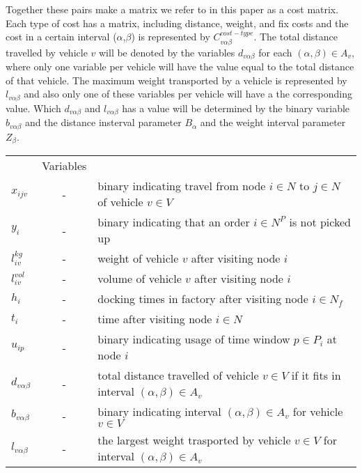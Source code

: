 \documentclass[a4paper,10pt]{article}
\begin{document}
Together these pairs make a matrix we refer to in this paper as a cost matrix. 
Each type of cost has a matrix, including distance, weight, and fix costs and the cost in a certain interval ($\alpha$,$\beta$) is represented by $C_{v\alpha\beta}^{cost-type}$. 
The total distance travelled by vehicle $v$ will be denoted by the variables $d_{v\alpha\beta}$ for each $(\alpha,\beta)\in A_v$, where only one variable per vehicle will have the value equal to the total distance of that vehicle. 
The maximum weight transported by a vehicle is represented by $l_{v\alpha\beta}$ and also only one of these variables per vehicle will have a the corresponding value.
Which $d_{v\alpha\beta}$ and $l_{v\alpha\beta}$ has a value will be determined by the binary variable $b_{v\alpha\beta}$ and the distance insterval parameter $B_\alpha$ and the weight interval parameter $Z_\beta$.  
\linebreak

\begin{tabular} {l c l}
    			&Variables										\\
	$x_{ijv}$	&-& 	binary indicating travel from node $i\in N$ to $j\in N$ of vehicle $v\in V$	\\
	$y_i$	        &-& 	binary indicating that an order $i\in N^P$ is not picked up             	\\
        $l_{iv}^{kg} $ 	&-& 	weight of vehicle $v$ after visiting node $i$        				\\
        $l_{iv}^{vol}$	&-&	volume of vehicle $v$ after visiting node $i$  					\\ 
	$h_i	$	&-&	docking times in factory after visiting node $i\in N_f$				\\
	$t_i 	$	&-&	time after visiting node $i\in N$						\\
	$u_{ip}	$	&-&	binary indicating usage of time window $p\in P_i$ at node $i$			\\
        $d_{v\alpha\beta} $	&-& 	total distance travelled of vehicle $v\in V$ if it fits in interval
                                                                                    $(\alpha, \beta) \in A_v$	\\
        $b_{v\alpha\beta} $	&-&	binary indicating interval $(\alpha, \beta) \in A_v$ for vehicle $v\in V$	\\
        $l_{v\alpha\beta}$ &-&	the largest weight trasported by vehicle $v \in V$ for interval $(\alpha,\beta) \in A_v$	\\

\end{tabular}
\linebreak
\linebreak
\par
\end{document}
